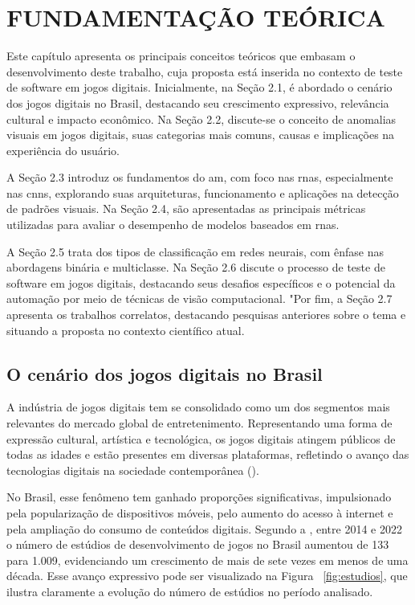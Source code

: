 \chapter{FUNDAMENTAÇÃO TEÓRICA}

Este capítulo apresenta os principais conceitos teóricos que embasam o desenvolvimento deste trabalho, cuja proposta está inserida no contexto de teste de software em jogos digitais. Inicialmente, na Seção 2.1, é abordado o cenário dos jogos digitais no Brasil, destacando seu crescimento expressivo, relevância cultural e impacto econômico. Na Seção 2.2, discute-se o conceito de anomalias visuais em jogos digitais, suas categorias mais comuns, causas e implicações na experiência do usuário.

A Seção 2.3 introduz os fundamentos do \gls{am}, com foco nas \glspl{rna}, especialmente nas \glspl{cnn}, explorando suas arquiteturas, funcionamento e aplicações na detecção de padrões visuais. Na Seção 2.4, são apresentadas as principais métricas utilizadas para avaliar o desempenho de modelos baseados em \glspl{rna}.

A Seção 2.5 trata dos tipos de classificação em redes neurais, com ênfase nas abordagens binária e multiclasse. Na Seção 2.6 discute o processo de teste de software em jogos digitais, destacando seus desafios específicos e o potencial da automação por meio de técnicas de visão computacional. "Por fim, a Seção 2.7 apresenta os trabalhos correlatos, destacando pesquisas anteriores sobre o tema e situando a proposta no contexto científico atual.

\section{O cenário dos jogos digitais no Brasil} %

A indústria de jogos digitais tem se consolidado como um dos segmentos mais relevantes do mercado global de entretenimento. Representando uma forma de expressão cultural, artística e tecnológica, os jogos digitais atingem públicos de todas as idades e estão presentes em diversas plataformas, refletindo o avanço das tecnologias digitais na sociedade contemporânea (). 

No Brasil, esse fenômeno tem ganhado proporções significativas, impulsionado pela popularização de dispositivos móveis, pelo aumento do acesso à internet e pela ampliação do consumo de conteúdos digitais. Segundo a , entre 2014 e 2022 o número de estúdios de desenvolvimento de jogos no Brasil aumentou de 133 para 1.009, evidenciando um crescimento de mais de sete vezes em menos de uma década. Esse avanço expressivo pode ser visualizado na Figura ~\ref{fig:estudios}, que ilustra claramente a evolução do número de estúdios no período analisado.

